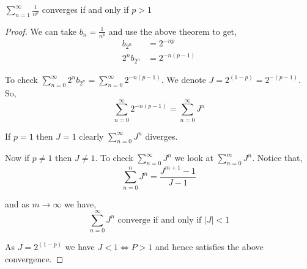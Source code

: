 \setcounter{prop}{14}
\begin{prop}
	$\sum_{n = 1}^{\infty} \frac{1}{n^{p}}$ converges if and only if $p > 1$
\end{prop}
\begin{proof}
	We can take $b_n = \frac{1}{n^{p}}$ and use the above theorem to get,
	\begin{align*}
		b_{2^{n}} &= 2^{ - np} \\
		2^{n}	b_{2^{n}} &= 2^{-n(p - 1)}
	\end{align*}

	To check $\sum_{n = 0}^{\infty} 2^{n} b_{2^{n}} = \sum_{n = 0}^{\infty} 2^{-n(p - 1)}$. We denote $J = 2^{(1 - p)} = 2^{-( p - 1)}$. So,
	$$
	\sum_{n = 0}^{\infty} 2^{-n(p - 1)} = \sum_{n = 0}^{\infty} J^{n}
	$$

	If $p = 1$ then $J = 1$ clearly $\sum_{n = 0}^{\infty} J^{n}$ diverges.
	\vspace{1em}
	
	Now if $p \ne 1 $ then $J \ne 1$. To check $\sum_{n = 0}^{\infty} J^{n}$ we look at $\sum_{n = 0}^{m} J^{n}$. Notice that, $$
	\sum_{n = 0}^{n} J^{n} = \frac{J^{m + 1} - 1}{J - 1}
	$$

	and as $m \to \infty$ we have, $$
	\sum_{n = 0}^{\infty} J^{n} \text{ converge if and only if $|J| < 1$}
	$$

	As $J = 2^{(1 - p)}$ we have $ J < 1 \iff P > 1$ and hence satisfies the above convergence.
\end{proof}

